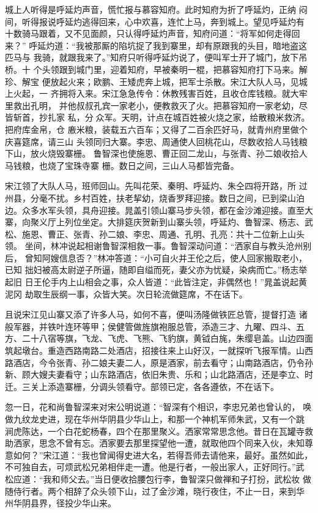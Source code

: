 城上人听得是呼延灼声音，慌忙报与慕容知府。此时知府为折了呼延灼，正纳
闷间，听得报说呼延灼逃得回来，心中欢喜，连忙上马，奔到城上。望见呼延灼有
十数骑马跟着，又不见面颜，只认得呼延灼声音，知府问道：“将军如何走得回来？”
呼延灼道：“我被那厮的陷坑捉了我到寨里，却有原跟我的头目，暗地盗这匹马与
我骑，就跟我来了。”知府只听得呼延灼说了，便叫军士开了城门，放下吊桥。十
个头领跟到城门里，迎着知府，早被秦明一棍，把慕容知府打下马来。解珍、解宝
便放起火来；欧鹏、王矮虎奔上城，把军士杀散。宋江大队人马，见城上火起，一
齐拥将入来。宋江急急传令：休教残害百姓，且收仓库钱粮。就大牢里救出孔明，
并他叔叔孔宾一家老小，便教救灭了火。把慕容知府一家老幼，尽皆斩首，抄扎家
私，分众军。天明，计点在城百姓被火烧之家，给散粮米救济。把府库金帛，仓
廒米粮，装载五六百车；又得了二百余匹好马，就青州府里做个庆喜筵席，请三山
头领同归大寨。李忠、周通使人回桃花山，尽数收拾人马钱粮下山，放火烧毁寨栅。
鲁智深也使施恩、曹正回二龙山，与张青、孙二娘收拾人马钱粮，也烧了宝珠寺寨
栅。数日之间，三山人马都皆完备。

宋江领了大队人马，班师回山。先叫花荣、秦明、呼延灼、朱仝四将开路，所
过州县，分毫不扰。乡村百姓，扶老挈幼，烧香罗拜迎接。数日之间，已到梁山泊
边。众多水军头领，具舟迎接。晁盖引领山寨马步头领，都在金沙滩迎接。直至大
寨，向聚义厅上列位坐定。大排筵庆贺新到山寨头领，呼延灼、鲁智深、杨志、武
松、施恩、曹正、张青、孙二娘、李忠、周通、孔明、孔亮：共十二位新上山头领。
坐间，林冲说起相谢鲁智深相救一事。鲁智深动问道：“洒家自与教头沧州别后，
曾知阿嫂信息否？”林冲答道：“小可自火并王伦之后，使人回家搬取老小，已知
拙妇被高太尉逆子所逼，随即自缢而死，妻父亦为忧疑，染病而亡。”杨志举起旧
日王伦手内上山相会之事，众人皆道：“此皆注定，非偶然也！”晁盖说起黄泥冈
劫取生辰纲一事，众皆大笑。次日轮流做筵席，不在话下。

且说宋江见山寨又添了许多人马，如何不喜，便叫汤隆做铁匠总管，提督打造
诸般军器，并铁叶连环等甲；侯健管做旌旗袍服总管，添造三才、九曜、四斗、五
方、二十八宿等旗，飞龙、飞虎、飞熊、飞豹旗，黄钺白旄，朱缨皂盖。山边四面
筑起墩台。重造西路南路二处酒店，招接往来上山好汉，一就探听飞报军情。山西
路酒店，今令张青、孙二娘夫妻二人，原是酒家，前去看守；山南路酒店，仍令孙
新、顾大嫂夫妻看守；山东路酒店，依旧朱贵、乐和；山北路酒店，还是李立、时
迁。三关上添造寨栅，分调头领看守。部领已定，各各遵依，不在话下。

忽一日，花和尚鲁智深来对宋公明说道：“智深有个相识，李忠兄弟也曾认的，
唤做九纹龙史进，现在华州华阴县少华山上，和那一个神机军师朱武，又有一个跳
涧虎陈达，一个白花蛇杨春，四个在那里聚义。洒家常常思念他。昔日在瓦罐寺救
助洒家，思念不曾有忘。洒家要去那里探望他一遭，就取他四个同来入伙，未知尊
意如何？”宋江道：“我也曾闻得史进大名，若得吾师去请他来，最好。虽然如此，
不可独自去，可烦武松兄弟相伴走一遭。他是行者，一般出家人，正好同行。”武
松应道：“我和师父去。”当日便收拾腰包行李，鲁智深只做禅和子打扮，武松妆
做随侍行者。两个相辞了众头领下山，过了金沙滩，晓行夜住，不止一日，来到华
州华阴县界，径投少华山来。

